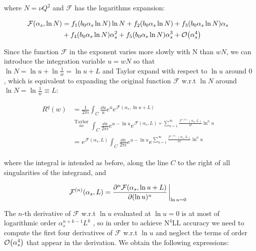 \documentclass[../main.tex]{subfiles}
\begin{document}
where $N=\nu Q^2$ and $\mathcal{F}$ has the logarithms expansion:

\begin{align}
    \begin{split}
    \mathcal{F}(\alpha_s,\ln N) &= f_1(b_0 \alpha_s \ln N) \ln N + f_2(b_0 \alpha_s \ln N) + f_3(b_0 \alpha_s \ln N) \alpha_s \\
    &+ f_4(b_0 \alpha_s \ln N) \alpha_s^2 + f_5(b_0 \alpha_s \ln N) \alpha_s^3 + \order{\alpha_s^4}
\end{split}
\end{align}

Since the function $\mathcal{F}$ in the exponent varies more slowly with N than $wN$, we can introduce the integration variable $u=wN$
so that $\ln N = \ln u +\ln \frac{1}{w} = \ln u + L$ and Taylor expand with respect to $\ln u$ around $0$, which is equivalent to expanding 
the original function $\mathcal{F}$ w.r.t $\ln N$ around $\ln N = \ln \frac{1}{w}\equiv L$:

\begin{align}
    \begin{split}\label{eq:Rw expansion}
       R^q(w) &= \frac{1}{2\pi i} \int_C \frac{\dd u}{u} e^{u} e^{\mathcal{F}(\alpha_s,\ln u + L)} \\
       &\stackrel{\text{Taylor}}{=} \int_C \frac{\dd u}{2\pi i} e^{u-\ln u} e^{\mathcal{F}(\alpha_s,L)+\sum_{n=1}^\infty \frac{\mathcal{F}^{(n)}(\alpha_s,L)}{n!}  \ln^n u}\\
       &= e^{\mathcal{F}(\alpha_s,L)} \int_C \frac{\dd u}{2\pi i} e^{u-\ln u} e^{\sum_{n=1}^\infty \frac{\mathcal{F}^{(n)}(\alpha_s,L)}{n!}  \ln^n u}
    \end{split}
\end{align}

where the integral is intended as before, along the line $C$ to the right of all singularities of the integrand, and 

\begin{equation}
    \mathcal{F}^{(n)}(\alpha_s,L) = \pdv[n]{\mathcal{F}(\alpha_s,\ln u + L )}{(\ln u)} \eval_{\ln u = 0}
\end{equation}

The $n$-th derivative of $\mathcal{F}$ w.r.t $\ln u$ evaluated at $\ln u = 0$ is 
at most of logarithmic order $\alpha_s^{n+k-1}L^k$ \cite{CATANI19933}, so in order to achieve $\text{N}^4\text{LL}$ accuracy we need to compute the first four derivatives of $\mathcal{F}$ w.r.t $\ln u$ and 
neglect the terms of order $\order{\alpha_s^4}$ that appear in the derivation. We obtain the following expressions: 
\end{document}
